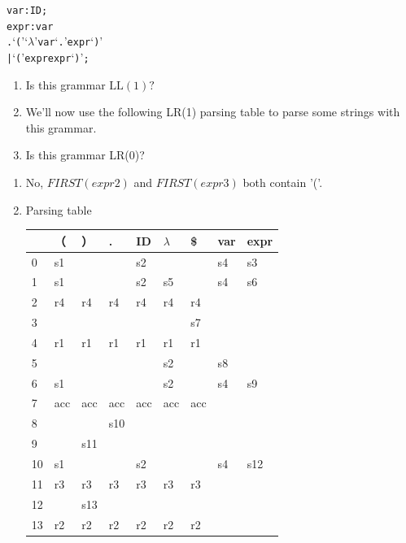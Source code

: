 \documentclass[a4paper]{exam}
\begin{document}
 \begin{alltt}
  var  : ID ;
  expr : var
       . ‘(’ ‘\(\lambda\)’ var ‘.’ expr ‘)’
       | ‘(’ expr expr ‘)’ ;
  \end{alltt}
\begin{enumerate}
    \item Is this grammar $\mathrm{LL}(1) ?$
    \item We'll now use the following LR(1) parsing table to parse some strings with this
    grammar.
    \item Is this grammar LR(0)?
\end{enumerate}
\begin{solution}
\begin{enumerate}
    \item No, $FIRST(expr2)$ and $FIRST(expr3)$ both contain '('.
    \item Parsing table
     \begin{table}[H]
     \centering
    \begin{tabular}{l|llllll|ll}
    \hline
       & （   & ）   & .   & ID  & $\lambda$   & \$  & var & expr \\ \hline
    0  & s1  &     &     & s2  &     &     & s4  & s3   \\
    1  & s1  &     &     & s2  & s5  &     & s4  & s6   \\
    2  & r4  & r4  & r4  & r4  & r4  & r4  &     &      \\
    3  &     &     &     &     &     & s7  &     &      \\
    4  & r1  & r1  & r1  & r1  & r1  & r1  &     &      \\
    5  &     &     &     &     & s2  &     & s8  &      \\
    6  & s1  &     &     &     & s2  &     & s4  & s9   \\
    7  & acc & acc & acc & acc & acc & acc &     &      \\
    8  &     &     & s10 &     &     &     &     &      \\
    9  &     & s11 &     &     &     &     &     &      \\
    10 & s1  &     &     & s2  &     &     & s4  & s12  \\
    11 & r3  & r3  & r3  & r3  & r3  & r3  &     &      \\
    12 &     & s13 &     &     &     &     &     &      \\
    13 & r2  & r2  & r2  & r2  & r2  & r2  &     &     
    \end{tabular}
    \end{table}

\end{enumerate}
\end{solution}
\end{document}
